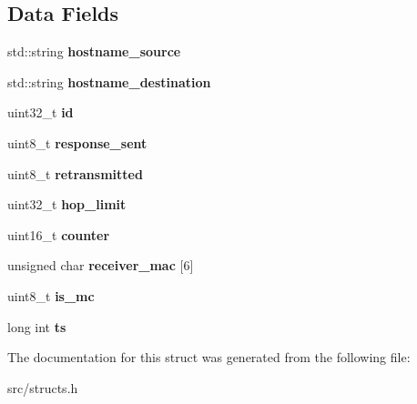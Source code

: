 \subsection*{Data Fields}
\begin{DoxyCompactItemize}
\item 
\hypertarget{structroute__request_ab8764096c5b2c5ac548c15b8e7dfca47}{std\-::string {\bfseries hostname\-\_\-source}}\label{structroute__request_ab8764096c5b2c5ac548c15b8e7dfca47}

\item 
\hypertarget{structroute__request_a099d050d48ad73c4103da292a9d54417}{std\-::string {\bfseries hostname\-\_\-destination}}\label{structroute__request_a099d050d48ad73c4103da292a9d54417}

\item 
\hypertarget{structroute__request_af8b4310475fa3aa088763216ee56d74b}{uint32\-\_\-t {\bfseries id}}\label{structroute__request_af8b4310475fa3aa088763216ee56d74b}

\item 
\hypertarget{structroute__request_ac095996499d316bf90013b43e0dce983}{uint8\-\_\-t {\bfseries response\-\_\-sent}}\label{structroute__request_ac095996499d316bf90013b43e0dce983}

\item 
\hypertarget{structroute__request_ad97432c9cb10b7786707d7997595d163}{uint8\-\_\-t {\bfseries retransmitted}}\label{structroute__request_ad97432c9cb10b7786707d7997595d163}

\item 
\hypertarget{structroute__request_acc39e89cc315066056546ff45b105c39}{uint32\-\_\-t {\bfseries hop\-\_\-limit}}\label{structroute__request_acc39e89cc315066056546ff45b105c39}

\item 
\hypertarget{structroute__request_a16c80fb782fa8f4b51b37fe985f4eb33}{uint16\-\_\-t {\bfseries counter}}\label{structroute__request_a16c80fb782fa8f4b51b37fe985f4eb33}

\item 
\hypertarget{structroute__request_a6d8b04dc7f9a752ff95a07a719b3081e}{unsigned char {\bfseries receiver\-\_\-mac} \mbox{[}6\mbox{]}}\label{structroute__request_a6d8b04dc7f9a752ff95a07a719b3081e}

\item 
\hypertarget{structroute__request_a695e027c314a5aab1d126ef648e2b28b}{uint8\-\_\-t {\bfseries is\-\_\-mc}}\label{structroute__request_a695e027c314a5aab1d126ef648e2b28b}

\item 
\hypertarget{structroute__request_a09cc4f667c391c037670cc9230022f9d}{long int {\bfseries ts}}\label{structroute__request_a09cc4f667c391c037670cc9230022f9d}

\end{DoxyCompactItemize}


The documentation for this struct was generated from the following file\-:\begin{DoxyCompactItemize}
\item 
src/structs.\-h\end{DoxyCompactItemize}
